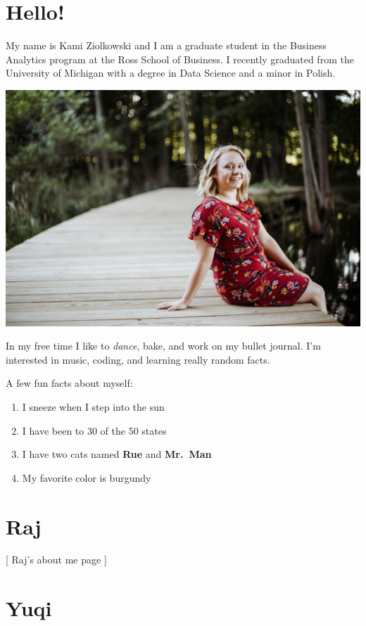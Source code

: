 \documentclass[
]{book}
\providecommand{\tightlist}{%
  \setlength{\itemsep}{0pt}\setlength{\parskip}{0pt}}
\begin{document}
\hypertarget{hello}{%
\section{Hello!}\label{hello}}

My name is Kami Ziolkowski and I am a graduate student in the Business Analytics program at the Ross School of Business. I recently graduated from the University of Michigan with a degree in Data Science and a minor in Polish.

\includegraphics{me2.jpg}

In my free time I like to \emph{dance}, bake, and work on my bullet journal. I'm interested in music, coding, and learning really random facts.

A few fun facts about myself:

\begin{enumerate}
\def\labelenumi{\arabic{enumi}.}
\tightlist
\item
  I sneeze when I step into the sun
\item
  I have been to 30 of the 50 states
\item
  I have two cats named \textbf{Rue} and \textbf{Mr.~Man}
\item
  My favorite color is burgundy
\end{enumerate}

\hypertarget{raj}{%
\section{Raj}\label{raj}}

{[} Raj's about me page {]}

\hypertarget{yuqi}{%
\section{Yuqi}\label{yuqi}}
\end{document}
